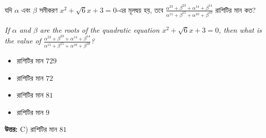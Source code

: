 \documentclass[12pt, a4paper]{article}
\begin{document}
\begin{tcolorbox}[questionbox={প্রশ্ন (Question) 28}]
    \noindent
    যদি $\alpha$ এবং $\beta$ সমীকরণ $x^2 + \sqrt{6}x + 3 = 0$-এর মূলদ্বয় হয়, তবে $\frac{\alpha^{23} + \beta^{23} + \alpha^{14} + \beta^{14}}{\alpha^{15} + \beta^{15} + \alpha^{10} + \beta^{10}}$ রাশিটির মান কত?
    
    \vspace{0.8em}
    \begin{english}
    \noindent\textit{\color{darkgray}
    If $\alpha$ and $\beta$ are the roots of the quadratic equation $x^2 + \sqrt{6}x + 3 = 0$, then what is the value of $\frac{\alpha^{23} + \beta^{23} + \alpha^{14} + \beta^{14}}{\alpha^{15} + \beta^{15} + \alpha^{10} + \beta^{10}}$?
    }
    \end{english}
\end{tcolorbox}

\begin{itemize}[label={}, leftmargin=1cm, itemsep=0.5em]
    \item[\textbf{A)}] রাশিটির মান $729$
    \item[\textbf{B)}] রাশিটির মান $72$
    \item[\textbf{C)}] রাশিটির মান $81$
    \item[\textbf{D)}] রাশিটির মান $9$
\end{itemize}

\vspace{0.5em}
\begin{tcolorbox}[answerbox]
    \textbf{\color{success} উত্তর:} C) রাশিটির মান $81$
\end{tcolorbox}
\vspace{1em}
\end{document}
